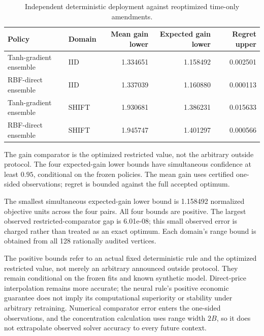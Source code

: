 \documentclass[11pt,letterpaper]{article}
\theoremstyle{definition}
\newcommand{\1}{\mathbf 1}
\begin{document}
\begin{table}[tbp]\centering\small
\caption{Independent deterministic deployment against reoptimized time-only amendments.}\label{tab:r22-validation}
\begin{tabular}{llrrr}
\toprule
Policy & Domain & Mean gain lower & Expected gain lower & Regret upper\\
\midrule
Tanh-gradient ensemble & IID & 1.334651 & 1.158492 & 0.002501\\
RBF-direct ensemble & IID & 1.337039 & 1.160880 & 0.000113\\
Tanh-gradient ensemble & SHIFT & 1.930681 & 1.386231 & 0.015633\\
RBF-direct ensemble & SHIFT & 1.945747 & 1.401297 & 0.000566\\
\bottomrule
\end{tabular}
\par\smallskip\begin{minipage}{.98\textwidth}\small The gain comparator is the optimized restricted value, not the arbitrary outside protocol. The four expected-gain lower bounds have simultaneous confidence at least $0.95$, conditional on the frozen policies. The mean gain uses certified one-sided observations; regret is bounded against the full accepted optimum.\end{minipage}
\end{table}



The smallest simultaneous expected-gain lower bound is 1.158492 normalized objective units across the four pairs. All four bounds are positive. The largest observed restricted-comparator gap is 6.01e-08; this small observed error is charged rather than treated as an exact optimum. Each domain's range bound is obtained from all 128 rationally audited vertices.


The positive bounds refer to an actual fixed deterministic rule and the optimized restricted value, not merely an arbitrary announced outside protocol. They remain conditional on the frozen fits and known synthetic model. Direct-price interpolation remains more accurate; the neural rule's positive economic guarantee does not imply its computational superiority or stability under arbitrary retraining. Numerical comparator error enters the one-sided observations, and the concentration calculation uses range width $2B$, so it does not extrapolate observed solver accuracy to every future context.
\end{document}
